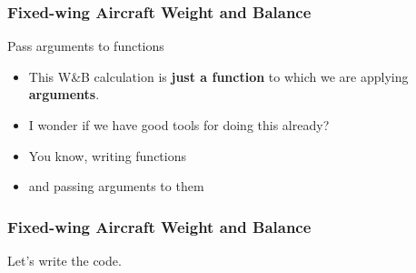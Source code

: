 \begin{frame}
\frametitle{Fixed-wing Aircraft Weight and Balance}
\begin{block}{Pass arguments to functions}
\begin{itemize}
\item<1-> This W\&B calculation is \textbf{just a function} to which we are applying \textbf{arguments}.
\item<2-> I wonder if we have good tools for doing this already?
\item<3-> You know, writing functions
\item<4-> and passing arguments to them
\end{itemize}
\end{block}
\end{frame}

\begin{frame}
\frametitle{Fixed-wing Aircraft Weight and Balance}
\begin{center}
Let's write the code.
\end{center}
\end{frame}

